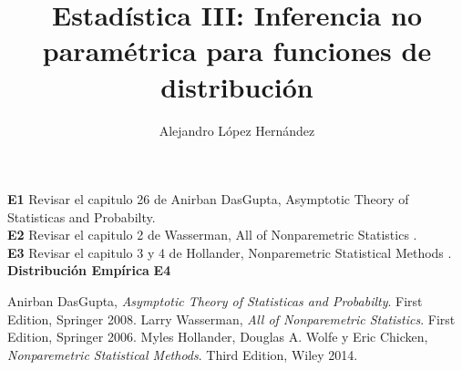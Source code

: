 \documentclass[11pt,spanish]{article}
\title{Estadística III: Inferencia no paramétrica para funciones de distribución}
\author{Alejandro López Hernández}
\begin{document}
\maketitle
\setlength\parindent{0pt}
\textbf{E1} Revisar el capitulo 26 de Anirban DasGupta, Asymptotic Theory of Statisticas and Probabilty\cite{DaGuspa}.\\
\textbf{E2} Revisar el capitulo 2 de Wasserman, All of Nonparemetric Statistics \cite{Wasserman}.\\
\textbf{E3} Revisar el capitulo 3 y 4  de Hollander, Nonparemetric Statistical Methods \cite{Hollander}.\\
\textbf{Distribución Empírica}
\textbf{E4}

\begin{thebibliography}{9}
Anirban DasGupta, \textit{Asymptotic Theory of Statisticas and Probabilty}. 
First Edition, Springer 2008.
Larry Wasserman, \textit{All of Nonparemetric Statistics}. 
First Edition, Springer 2006.
Myles Hollander, Douglas A. Wolfe y Eric Chicken, \textit{Nonparemetric Statistical Methods}. 
Third Edition, Wiley 2014.
\end{thebibliography}
\end{document}
